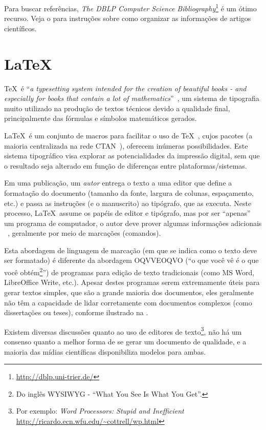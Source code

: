 Para buscar referências, \emph{The DBLP Computer Science Bibliography}\footnote{
\url{http://dblp.uni-trier.de/}} é um ótimo recurso. Veja o  
para instruções sobre como organizar as informações de artigos científicos.

\section{\LaTeX}%

\TeX\ é ``\emph{a typesetting system intended for the creation of beautiful books
 - and especially for books that contain a lot of mathematics}''~\cite{Knuth_1986_texbook},
 um sistema de tipografia muito utilizado na produção de textos técnicos devido
 a qualidade final, principalmente das fórmulas e símbolos matemáticos gerados.

\LaTeX\ é um conjunto de macros para facilitar o uso de \TeX~\cite{lamport_latex:_1994},
cujos pacotes (a maioria centralizada na rede \acrshort{CTAN}~\cite{greenwade93}), oferecem
inúmeras possibilidades. Este sistema tipográfico visa explorar as potencialidades
da impressão digital, sem que o resultado seja alterado em função de diferenças
entre plataformas/sistemas.

Em uma publicação, um \emph{autor} entrega o texto a uma editor que define a formatação do 
documento (tamanho da fonte, largura de colunas, espaçamento, etc.) e passa as instruções (e o 
manuscrito) ao tipógrafo, que as executa. Neste processo, \LaTeX\ assume os papéis de editor e 
tipógrafo, mas por ser ``apenas'' um programa de computador, o autor deve prover algumas 
informações adicionais ~\cite{Oetiker_1995_notsoshort}, geralmente por meio de marcações 
(comandos).

Esta abordagem de linguagem de marcação (em que se indica como o texto deve ser
formatado) é diferente da abordagem OQVVEOQVO (``o que você vê é o que você
obtém\footnote{Do inglês WYSIWYG - ``What You See Is What You Get''.}'') de programas
para edição de texto tradicionais (como MS Word, LibreOffice Write, etc.).
Apesar destes programas serem extremamente úteis para gerar textos simples, que
são a grande maioria dos documentos, eles geralmente não têm a capacidade de lidar
corretamente com documentos complexos (como dissertações ou teses), conforme ilustrado
na .%

%

Existem diversas discussões quanto ao uso de editores de texto\footnote{Por exemplo:
\emph{Word Processors: Stupid and Inefficient} \url{http://ricardo.ecn.wfu.edu/~cottrell/wp.html}},
não há um consenso quanto a melhor forma de se gerar um documento de qualidade,
e a maioria das mídias científicas disponibiliza modelos para ambas.

